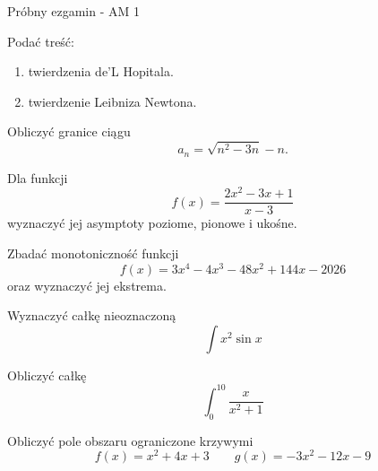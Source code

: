 \documentclass[12pt,a4paper]{article}
\begin{document}
	
	\begin{center}
		\Large Próbny ezgamin - AM 1
	\end{center}

	\begin{zad}
		Podać treść:
		\begin{enumerate}[1)]
			\item twierdzenia de'L Hopitala.
			\item twierdzenie Leibniza Newtona.
		\end{enumerate}
	\end{zad}

	\begin{zad}
		Obliczyć granice ciągu
		$$a_n=\sqrt{n^2-3n} - n.$$
	\end{zad}

	\begin{zad}
		Dla funkcji
		$$f(x)=\frac{2x^2-3x+1}{x-3}$$
		wyznaczyć jej asymptoty poziome, pionowe i ukośne.
	\end{zad}

	\begin{zad}
		Zbadać monotoniczność funkcji
		$$f(x)=3x^4-4x^3-48x^2+144x-2026$$
		oraz wyznaczyć jej ekstrema.
	\end{zad}

	\begin{zad}
		Wyznaczyć całkę nieoznaczoną
		$$\int x^2\sin x$$
	\end{zad}

	\begin{zad}
		Obliczyć całkę
		$$\int_{0}^{10} \frac{x}{x^2+1}$$
	\end{zad}

	\begin{zad}
		Obliczyć pole obszaru ograniczone krzywymi
		$$f(x)=x^2+4x+3 \qquad g(x)=-3x^2-12x-9$$ 
	\end{zad}
	
\end{document}
